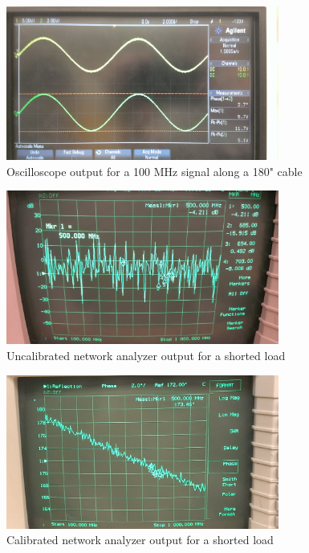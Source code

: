 \documentclass{article}
\begin{document}
\begin{figure}[H]
    \centering
    \includegraphics[width=0.8\textwidth]{./Images/RoleWave4.jpg}
    \caption{Oscilloscope output for a 100 MHz signal along a 180" cable}
\end{figure}
\begin{figure}[H]
    \centering
    \includegraphics[width=0.8\textwidth]{./Images/NetShortUncal.jpg}
    \caption{Uncalibrated network analyzer output for a shorted load}
\end{figure}
\begin{figure}[H]
    \centering
    \includegraphics[width=0.8\textwidth]{./Images/NetShortCal.jpg}
    \caption{Calibrated network analyzer output for a shorted load}
\end{figure}
\end{document}
